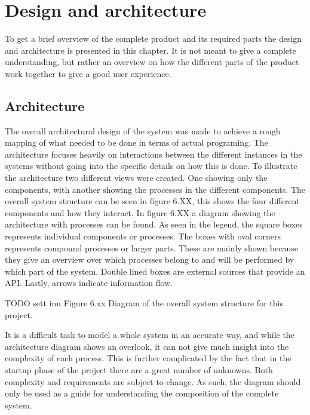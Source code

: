 
\chapter{Design and architecture}

To get a brief overview of the complete product and its required parts the design and architecture is presented in this chapter. It is not meant to give a complete understanding, but rather an overview on how the different parts of the product work together to give a good user experience.

\section{Architecture}

The overall architectural design of the system was made to achieve a rough mapping of what needed to be done in terms of actual programing. The architecture focuses heavily on interactions between the different instances in the systems without going into the specific details on how this is done. To illustrate the architecture two different views were created. One showing only the components, with another showing the processes in the different components. The overall system structure can be seen in figure 6.XX, this shows the four different components and how they interact. In figure 6.XX a diagram showing the architecture with processes can be found. As seen in the legend, the square boxes represents individual components or processes. The boxes with oval corners represents compound processes or larger parts. These are mainly shown because they give an overview over which processes belong to and will be performed by which part of the system. Double lined boxes are external sources that provide an API. Lastly, arrows indicate information flow.

TODO sett inn Figure 6.xx Diagram of the overall system structure for this project.\newline

It is a difficult task to model a whole system in an accurate way, and while the architecture diagram shows an overlook, it can not give much insight into the complexity of each process. This is further complicated by the fact that in the startup phase of the project there are a great number of unknowns. Both complexity and requirements are subject to change. As such, the diagram should only be used as a guide for understanding the composition of the complete system.

